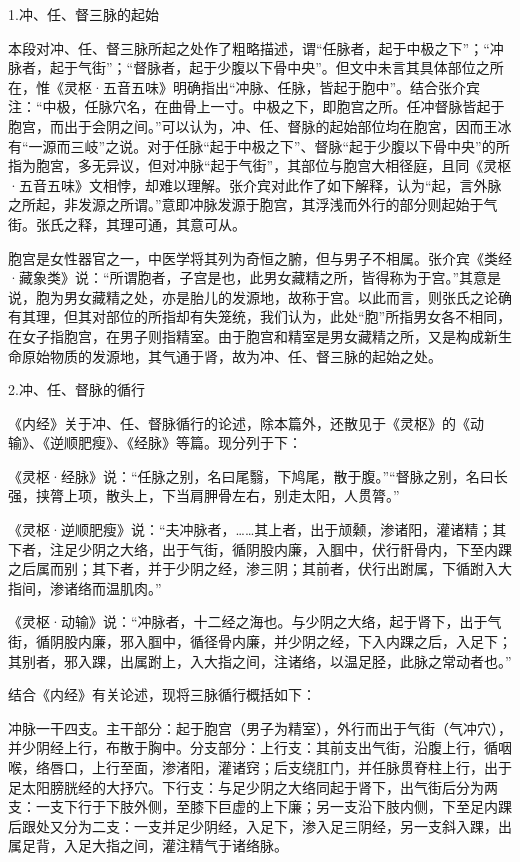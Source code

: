 \documentclass[12pt]{ctexbook}%
\begin{document}

1.冲、任、督三脉的起始

本段对冲、任、督三脉所起之处作了粗略描述，谓“任脉者，起于中极之下”；“冲脉者，起于气街”；“督脉者，起于少腹以下骨中央”。但文中未言其具体部位之所在，惟《灵枢·五音五味》明确指出“冲脉、任脉，皆起于胞中”。结合张介宾注：“中极，任脉穴名，在曲骨上一寸。中极之下，即胞宫之所。任冲督脉皆起于胞宫，而出于会阴之间。”可以认为，冲、任、督脉的起始部位均在胞宮，因而王冰有“一源而三岐”之说。对于任脉“起于中极之下”、督脉“起于少腹以下骨中央”的所指为胞宮，多无异议，但对冲脉“起于气街”，其部位与胞宫大相径庭，且同《灵枢·五音五味》文相悖，却难以理解。张介宾对此作了如下解释，认为“起，言外脉之所起，非发源之所谓。”意即冲脉发源于胞宫，其浮浅而外行的部分则起始于气街。张氏之释，其理可通，其意可从。

胞宫是女性器官之一，中医学将其列为奇恒之腑，但与男子不相属。张介宾《类经·藏象类》说：“所谓胞者，子宫是也，此男女藏精之所，皆得称为于宫。”其意是说，胞为男女藏精之处，亦是胎儿的发源地，故称于宫。以此而言，则张氏之论确有其理，但其对部位的所指却有失笼统，我们认为，此处“胞”所指男女各不相同，在女子指胞宫，在男子则指精室。由于胞宫和精室是男女藏精之所，又是构成新生命原始物质的发源地，其气通于肾，故为冲、任、督三脉的起始之处。

2.冲、任、督脉的循行

《内经》关于冲、任、督脉循行的论述，除本篇外，还散见于《灵枢》的《动输》、《逆顺肥瘦》、《经脉》等篇。现分列于下：

《灵枢·经脉》说：“任脉之别，名曰尾翳，下鸠尾，散于腹。”“督脉之别，名曰长强，挟膂上项，散头上，下当肩胛骨左右，别走太阳，人贯膂。”

《灵枢·逆顺肥瘦》说：“夫冲脉者，……其上者，出于颃颡，渗诸阳，灌诸精；其下者，注足少阴之大络，出于气街，循阴股内廉，入腘中，伏行骭骨内，下至内踝之后属而别；其下者，并于少阴之经，渗三阴；其前者，伏行出跗属，下循跗入大指间，渗诸络而温肌肉。”

《灵枢·动输》说：“冲脉者，十二经之海也。与少阴之大络，起于肾下，出于气街，循阴股内廉，邪入腘中，循径骨内廉，并少阴之经，下入内踝之后，入足下；其别者，邪入踝，出属跗上，入大指之间，注诸络，以温足胫，此脉之常动者也。”

结合《内经》有关论述，现将三脉循行概括如下：

冲脉一干四支。主干部分：起于胞宫（男子为精室），外行而出于气街（气冲穴），并少阴经上行，布散于胸中。分支部分：上行支：其前支出气街，沿腹上行，循咽喉，络唇口，上行至面，渗渚阳，灌诸窍；后支绕肛门，并任脉贯脊柱上行，出于足太阳膀胱经的大抒穴。下行支：与足少阴之大络同起于肾下，出气街后分为两支：一支下行于下肢外侧，至膝下巨虚的上下廉；另一支沿下肢内侧，下至足内踝后跟处又分为二支：一支并足少阴经，入足下，渗入足三阴经，另一支斜入踝，出属足背，入足大指之间，灌注精气于诸络脉。
\end{document}
